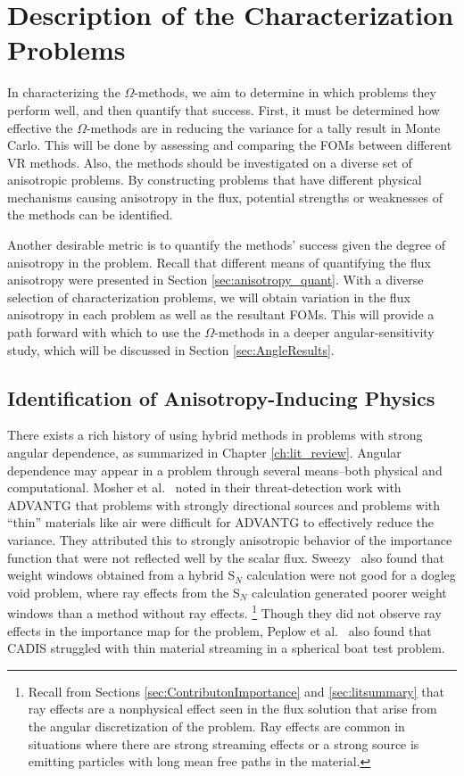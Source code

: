 \section{Description of the Characterization Problems}
\label{sec:AngleProbDesc}

In characterizing the $\Omega$-methods, we aim to determine in which problems
they perform well, and then quantify that success.
First, it must be determined how effective the
$\Omega$-methods are in reducing the variance for a tally result in Monte Carlo.
This will be done by assessing and comparing the FOMs between different VR methods.
Also, the methods should be investigated on a diverse set of anisotropic
problems. By constructing problems that have
different physical mechanisms causing
anisotropy in the flux, potential strengths or weaknesses of the methods can be identified.

Another desirable metric is to quantify the methods' success given the
degree of anisotropy in the problem. Recall that different
means of quantifying the flux
anisotropy were presented in Section \ref{sec:anisotropy_quant}. With a diverse
selection of characterization problems, we will obtain variation in the flux
anisotropy in each problem as well as the resultant FOMs. This will provide a path forward with which to use the $\Omega$-methods in a deeper
angular-sensitivity study, which will be discussed in Section
\ref{sec:AngleResults}.

\subsection{Identification of Anisotropy-Inducing Physics}
\label{subsec:AngleProbID}

There exists a rich history of using hybrid methods in problems with strong
angular dependence, as summarized in Chapter \ref{ch:lit_review}. Angular
dependence may appear in a problem through several means--both physical and
computational.
Mosher et al.~\cite{mosher_automated_2009} noted in their threat-detection work with ADVANTG
that problems with strongly directional sources and
problems with ``thin'' materials like air were difficult for ADVANTG to effectively
reduce the variance. They attributed this to strongly anisotropic behavior of the
importance function that were not reflected well by the scalar flux. Sweezy~\cite{sweezy_automated_2005} also found that weight windows obtained
from a hybrid S$_N$ calculation were not good for a dogleg void problem,
where ray effects from the S$_N$ calculation generated poorer weight windows
than a method without ray effects. \footnote{Recall from
Sections \ref{sec:ContributonImportance} and \ref{sec:litsummary} that ray
effects are a nonphysical effect seen in the flux solution that arise from
the angular discretization of the problem.
Ray effects are common in situations where there are strong
streaming effects or a strong source is emitting particles with
long mean free paths in the material.} Though they did not observe ray effects in
the importance map for the problem, Peplow et
al.~\cite{peplow_consistent_2012} also found that CADIS struggled with thin material streaming in a spherical
boat test problem.


